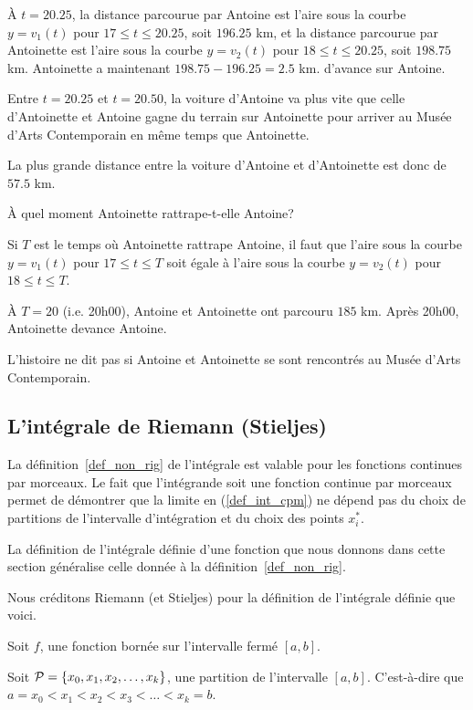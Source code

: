 {\begin{egg}
À $t=20.25$, la distance parcourue par Antoine est l'aire sous
la courbe $y=v_1(t)$ pour $17\leq t \leq 20.25$, soit $196.25$ km, et
la distance parcourue par Antoinette est l'aire sous la courbe
$y=v_2(t)$ pour $18\leq t \leq 20.25$, soit $198.75$ km.
Antoinette a maintenant $198.75-196.25= 2.5$ km. d'avance sur
Antoine.

Entre $t=20.25$ et $t=20.50$, la voiture d'Antoine va plus vite que
celle d'Antoinette et Antoine gagne du terrain sur Antoinette pour
arriver au Musée d'Arts Contemporain en même temps que Antoinette.

La plus grande distance entre la voiture d'Antoine et d'Antoinette est
donc de $57.5$ km.

 À quel moment Antoinette rattrape-t-elle Antoine?

Si $T$ est le temps où Antoinette rattrape Antoine, il faut que l'aire
sous la courbe $y=v_1(t)$ pour $17\leq t \leq T$ soit égale à l'aire
sous la courbe $y=v_2(t)$ pour $18\leq t \leq T$.

À $T = 20$ (i.e. 20h00), Antoine et Antoinette ont parcouru $185$ km.
Après 20h00, Antoinette devance Antoine.

L'histoire ne dit pas si Antoine et Antoinette se sont rencontrés au
Musée d'Arts Contemporain.
\end{egg}

\subsection{L'intégrale de Riemann (Stieljes) \theory} \label{Riemann_int}

La définition~\ref{def_non_rig} de l'intégrale est valable pour les
fonctions continues par morceaux.  Le fait que l'intégrande soit une
fonction continue par morceaux permet de démontrer que la limite en
(\ref{def_int_cpm}) ne dépend pas du choix de partitions de
l'intervalle d'intégration et du choix des points $x_i^\ast$.

La définition de l'intégrale définie d'une fonction que nous donnons
dans cette section généralise celle donnée à la définition~\ref{def_non_rig}.

Nous créditons Riemann (et Stieljes) pour la définition de l'intégrale
définie que voici.

Soit $f$, une fonction bornée sur l'intervalle fermé $[a,b]$.

Soit ${\cal P} = \{x_0, x_1, x_2, \ldots, x_k\}$, une partition de
l'intervalle $[a,b]$.  C'est-à-dire que
$a=x_0 < x_1 < x_2 < x_3 < \ldots < x_k = b$.

}
